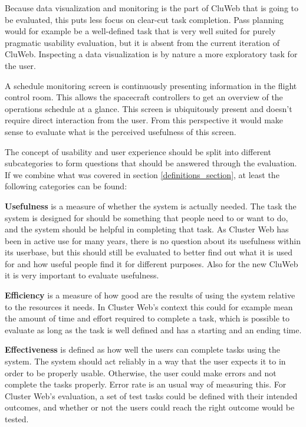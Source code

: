 Because data visualization and monitoring is the part of CluWeb that is going to be evaluated, this puts less focus on clear-cut task completion. Pass planning would for example be a well-defined task that is very well suited for purely pragmatic usability evaluation, but it is absent from the current iteration of CluWeb. Inspecting a data visualization is by nature a more exploratory task for the user.

A schedule monitoring screen is continuously presenting information in the flight control room. This allows the spacecraft controllers to get an overview of the operations schedule at a glance. This screen is ubiquitously present and doesn't require direct interaction from the user. From this perspective it would make sense to evaluate what is the perceived usefulness of this screen.

The concept of usability and user experience should be split into different subcategories to form questions that should be answered through the evaluation. If we combine what was covered in section \ref{definitions_section}, at least the following categories can be found:

\textbf{Usefulness} is a measure of whether the system is actually needed. The task the system is designed for should be something that people need to or want to do, and the system should be helpful in completing that task. As Cluster Web has been in active use for many years, there is no question about its usefulness within its userbase, but this should still be evaluated to better find out what it is used for and how useful people find it for different purposes. Also for the new CluWeb it is very important to evaluate usefulness.

\textbf{Efficiency} is a measure of how good are the results of using the system relative to the resources it needs. In Cluster Web's context this could for example mean the amount of time and effort required to complete a task, which is possible to evaluate as long as the task is well defined and has a starting and an ending time.

\textbf{Effectiveness} is defined as how well the users can complete tasks using the system. The system should act reliably in a way that the user expects it to in order to be properly usable. Otherwise, the user could make errors and not complete the tasks properly. Error rate is an usual way of measuring this. For Cluster Web's evaluation, a set of test tasks could be defined with their intended outcomes, and whether or not the users could reach the right outcome would be tested.

